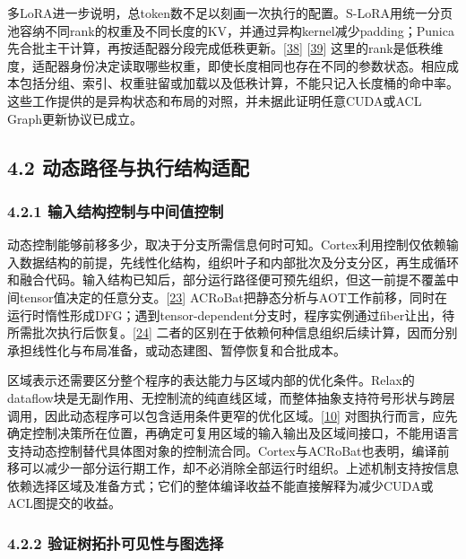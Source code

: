 \documentclass[
  11pt,
  UTF8]{ctexart}
\begin{document}
多LoRA进一步说明，总token数不足以刻画一次执行的配置。S-LoRA用统一分页池容纳不同rank的权重及不同长度的KV，并通过异构kernel减少padding；Punica先合批主干计算，再按适配器分段完成低秩更新。{[}\protect\hyperlink{ref-sheng2024slora}{38}{]}
{[}\protect\hyperlink{ref-chen2024punica}{39}{]}
这里的rank是低秩维度，适配器身份决定读取哪些权重，即使长度相同也存在不同的参数状态。相应成本包括分组、索引、权重驻留或加载以及低秩计算，不能只记入长度桶的命中率。这些工作提供的是异构状态和布局的对照，并未据此证明任意CUDA或ACL
Graph更新协议已成立。

\hypertarget{section-4-2}{%
\subsection{4.2 动态路径与执行结构适配}\label{section-4-2}}

\hypertarget{section-4-2-1}{%
\subsubsection{4.2.1 输入结构控制与中间值控制}\label{section-4-2-1}}

动态控制能够前移多少，取决于分支所需信息何时可知。Cortex利用控制仅依赖输入数据结构的前提，先线性化结构，组织叶子和内部批次及分支分区，再生成循环和融合代码。输入结构已知后，部分运行路径便可预先组织，但这一前提不覆盖中间tensor值决定的任意分支。{[}\protect\hyperlink{ref-fegade2021cortex}{23}{]}
ACRoBat把静态分析与AOT工作前移，同时在运行时惰性形成DFG；遇到tensor-dependent分支时，程序实例通过fiber让出，待所需批次执行后恢复。{[}\protect\hyperlink{ref-fegade2024acrobat}{24}{]}
二者的区别在于依赖何种信息组织后续计算，因而分别承担线性化与布局准备，或动态建图、暂停恢复和合批成本。

区域表示还需要区分整个程序的表达能力与区域内部的优化条件。Relax的dataflow块是无副作用、无控制流的纯直线区域，而整体抽象支持符号形状与跨层调用，因此动态程序可以包含适用条件更窄的优化区域。{[}\protect\hyperlink{ref-lai2025relax}{10}{]}
对图执行而言，应先确定控制决策所在位置，再确定可复用区域的输入输出及区域间接口，不能用语言支持动态控制替代具体图对象的控制流合同。Cortex与ACRoBat也表明，编译前移可以减少一部分运行期工作，却不必消除全部运行时组织。上述机制支持按信息依赖选择区域及准备方式；它们的整体编译收益不能直接解释为减少CUDA或ACL图提交的收益。

\hypertarget{section-4-2-2}{%
\subsubsection{4.2.2 验证树拓扑可见性与图选择}\label{section-4-2-2}}
\end{document}
